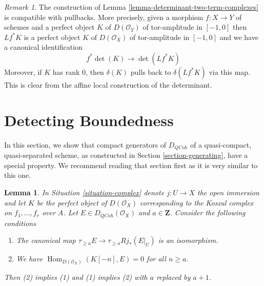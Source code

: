 \documentclass{stacks-project}
\theoremstyle{plain}
\newtheorem{lemma}[subsection]{Lemma}
\theoremstyle{definition}
\theoremstyle{remark}
\newtheorem{remark}[subsection]{Remark}
\numberwithin{equation}{subsection}
\def\Hom{\mathop{\mathrm{Hom}}\nolimits}
\def\QCoh{\mathit{QCoh}}
\begin{document}
\begin{remark}
\label{remark-functorial-det}
The construction of Lemma \ref{lemma-determinant-two-term-complexes}
is compatible with pullbacks. More precisely, given a morphism
$f : X \to Y$ of schemes and a perfect object $K$ of $D(\mathcal{O}_Y)$
of tor-amplitude in $[-1, 0]$ then $Lf^*K$ is a
perfect object $K$ of $D(\mathcal{O}_X)$
of tor-amplitude in $[-1, 0]$ and we have a canonical identification
$$
f^*\det(K) \longrightarrow \det(Lf^*K)
$$
Moreover, if $K$ has rank $0$, then $\delta(K)$ pulls back to
$\delta(Lf^*K)$ via this map. This is clear from the affine local
construction of the determinant.
\end{remark}






\section{Detecting Boundedness}
\label{section-detecting-boundedness}

\noindent
In this section, we show that compact generators of $D_\QCoh$ of a
quasi-compact, quasi-separated scheme, as constructed in
Section \ref{section-generating}, have a special property.
We recommend reading that section first as it is very similar to this one.

\begin{lemma}
\label{lemma-orthogonal-koszul-first-variant}
In Situation \ref{situation-complex} denote $j : U \to X$ the open
immersion and let $K$ be the perfect object of $D(\mathcal{O}_X)$
corresponding to the Koszul complex on $f_1, \ldots, f_r$ over $A$.
Let $E \in D_\QCoh(\mathcal{O}_X)$ and $a \in \mathbf{Z}$.
Consider the following conditions
\begin{enumerate}
\item The canonical map $\tau_{\geq a}E \to \tau_{\geq a} Rj_*(E|_U)$
is an isomorphism.
\item We have $\Hom_{D(\mathcal{O}_X)}(K[-n], E) = 0$ for all $n \geq a$.
\end{enumerate}
Then (2) implies (1) and (1) implies (2) with $a$ replaced by $a + 1$.
\end{lemma}
\end{document}
